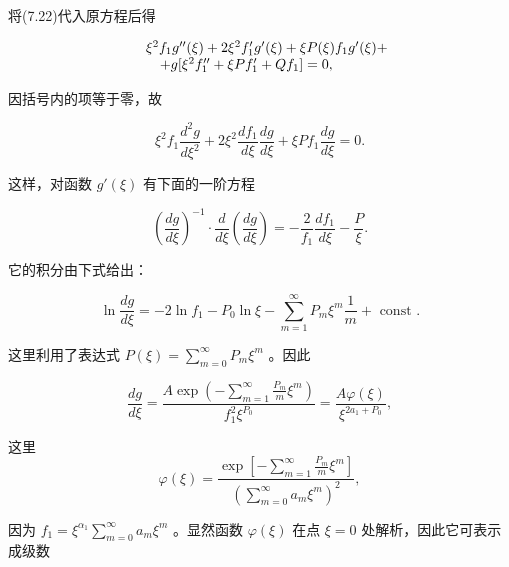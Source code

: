 将(7.22)代入原方程后得

\begin{equation*}
\begin{array}{r l} & \xi^ {2} f _ {1} g ^ {\prime \prime} (\xi) + 2 \xi^ {2} f _ {1} ^ {\prime} g ^ {\prime} (\xi) + \xi P (\xi) f _ {1} g ^ {\prime} (\xi) + \\ & \quad + g [ \xi^ {2} f _ {1} ^ {\prime \prime} + \xi P f _ {1} ^ {\prime} + Q f _ {1} ] = 0, \end{array}
\end{equation*}

因括号内的项等于零，故

\begin{equation*}
\xi^ {2} f _ {1} \frac {d ^ {2} g}{d \xi^ {2}} + 2 \xi^ {2} \frac {d f _ {1}}{d \xi} \frac {d g}{d \xi} + \xi P f _ {1} \frac {d g}{d \xi} = 0.
\end{equation*}

这样，对函数 $g'(\xi)$ 有下面的一阶方程

\begin{equation*}
\left(\frac {d g}{d \xi}\right) ^ {- 1} \cdot \frac {d}{d \xi} \left(\frac {d g}{d \xi}\right) = - \frac {2}{f _ {1}} \frac {d f _ {1}}{d \xi} - \frac {P}{\xi}.\tag{7.23}
\end{equation*}

它的积分由下式给出：

\begin{equation*}
\ln \frac {d g}{d \xi} = - 2 \ln f _ {1} - P _ {0} \ln \xi - \sum_ {m = 1} ^ {\infty} P _ {m} \xi^ {m} \frac {1}{m} + \text { const }.\tag{7.24}
\end{equation*}

这里利用了表达式 $P(\xi) = \sum_{m=0}^{\infty} P_m \xi^m$ 。因此

\begin{equation*}
\frac {d g}{d \xi} = \frac {A \exp \left(- \sum_ {m = 1} ^ {\infty} \frac {P _ {m}}{m} \xi^ {m}\right)}{f _ {1} ^ {2} \xi^ {P _ {0}}} = \frac {A \varphi (\xi)}{\xi^ {2 a _ {1} + P _ {0}}},\tag{7.25}
\end{equation*}

这里
\begin{equation*}
\varphi (\xi) = \frac {\exp \left[ - \sum_ {m = 1} ^ {\infty} \frac {P _ {m}}{m} \xi^ {m} \right]}{\left(\sum_ {m = 0} ^ {\infty} a _ {m} \xi^ {m}\right) ^ {2}},
\end{equation*}

因为 $f_{1} = \xi^{\alpha_{1}}\sum_{m = 0}^{\infty}a_{m}\xi^{m}$ 。显然函数 $\varphi (\xi)$ 在点 $\xi = 0$ 处解析，因此它可表示成级数

